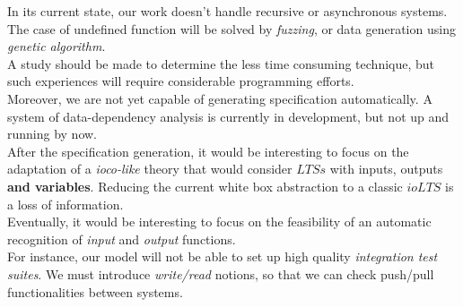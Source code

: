 \documentclass[a4paper]{report}
\begin{document}
In its current state, our work doesn't handle recursive or asynchronous systems.\\
\newline
The case of undefined function will be solved by \textit{fuzzing}, or data generation using \textit{genetic algorithm}.\\
A study should be made to determine the less time consuming technique, but such experiences will require considerable programming efforts.\\
\newline
Moreover, we are not yet capable of generating specification automatically. A system of data-dependency analysis is currently in development, but not up and running by now.\\
After the specification generation, it would be interesting to focus on the adaptation of a \textit{ioco-like} theory that would consider $LTSs$ with inputs, outputs \textbf{and variables}. Reducing the current white box abstraction to a classic $ioLTS$ is a loss of information.\\
\newline
Eventually, it would be interesting to focus on the feasibility of an automatic recognition of \textit{input} and \textit{output} functions.\\
For instance, our model will not be able to set up high quality \textit{integration test suites}. We must introduce \textit{write/read} notions, so that we can check push/pull functionalities between systems.\\
\newline






\newpage
\end{document}

